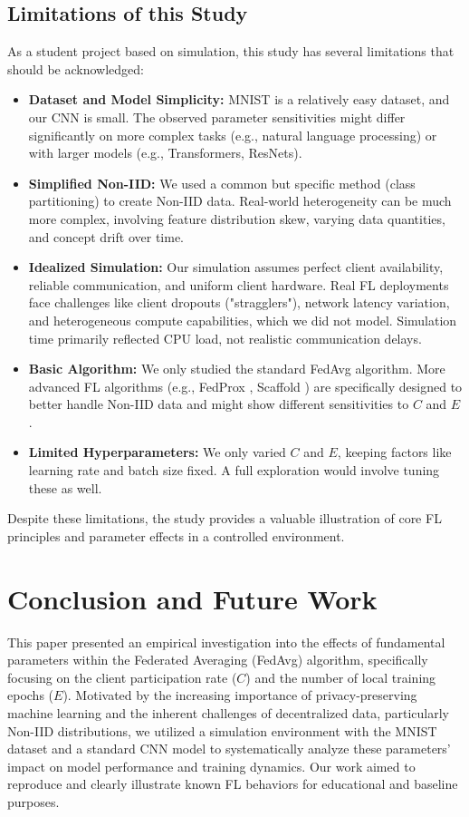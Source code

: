 \documentclass[conference]{IEEEtran}
\begin{document}
\subsection{Limitations of this Study}
As a student project based on simulation, this study has several limitations that should be acknowledged:
\begin{itemize}
    \item \textbf{Dataset and Model Simplicity:} MNIST is a relatively easy dataset, and our CNN is small. The observed parameter sensitivities might differ significantly on more complex tasks (e.g., natural language processing) or with larger models (e.g., Transformers, ResNets).
    \item \textbf{Simplified Non-IID:} We used a common but specific method (class partitioning) to create Non-IID data. Real-world heterogeneity can be much more complex, involving feature distribution skew, varying data quantities, and concept drift over time.
    \item \textbf{Idealized Simulation:} Our simulation assumes perfect client availability, reliable communication, and uniform client hardware. Real FL deployments face challenges like client dropouts ("stragglers"), network latency variation, and heterogeneous compute capabilities, which we did not model. Simulation time primarily reflected CPU load, not realistic communication delays.
    \item \textbf{Basic Algorithm:} We only studied the standard FedAvg algorithm. More advanced FL algorithms (e.g., FedProx \cite{b8}, Scaffold \cite{b7}) are specifically designed to better handle Non-IID data and might show different sensitivities to $C$ and $E$.
    \item \textbf{Limited Hyperparameters:} We only varied $C$ and $E$, keeping factors like learning rate and batch size fixed. A full exploration would involve tuning these as well.
\end{itemize}
Despite these limitations, the study provides a valuable illustration of core FL principles and parameter effects in a controlled environment.


\section{Conclusion and Future Work}
This paper presented an empirical investigation into the effects of fundamental parameters within the Federated Averaging (FedAvg) algorithm, specifically focusing on the client participation rate ($C$) and the number of local training epochs ($E$). Motivated by the increasing importance of privacy-preserving machine learning and the inherent challenges of decentralized data, particularly Non-IID distributions, we utilized a simulation environment with the MNIST dataset and a standard CNN model to systematically analyze these parameters' impact on model performance and training dynamics. Our work aimed to reproduce and clearly illustrate known FL behaviors for educational and baseline purposes.
\end{document}
